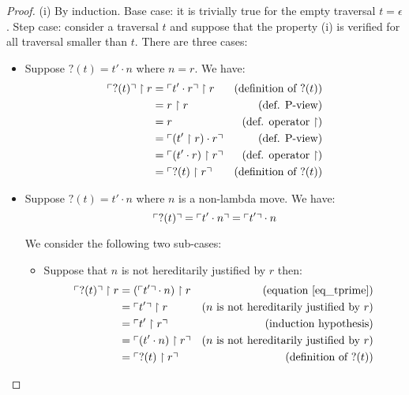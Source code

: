 \begin{proof}
(i) By induction. Base case: it is trivially true for the empty
traversal $t = \epsilon$. Step case: consider a traversal $t$ and
suppose that the property (i) is verified for all traversal smaller
than $t$. There are three cases:
\begin{itemize}
\item Suppose $?(t) = t' \cdot n$ where $n = r$. We have:
    \begin{align*}
    \ulcorner ?(t) \urcorner \upharpoonright  r
        &=  \ulcorner t' \cdot r  \urcorner \upharpoonright  r       & (\mbox{definition of } ?(t))\\
        &=  r \upharpoonright  r                         & (\mbox{def. P-view})\\
        &=  r                                                & (\mbox{def. operator $\upharpoonright$})\\
        &=  \ulcorner (t' \upharpoonright  r ) \cdot r  \urcorner    & (\mbox{def. P-view})\\
        &=  \ulcorner (t' \cdot r)  \upharpoonright  r  \urcorner    & (\mbox{def. operator $\upharpoonright$})\\
        &= \ulcorner ?(t) \upharpoonright  r  \urcorner                & (\mbox{definition of } ?(t))
    \end{align*}

\item Suppose $?(t) = t' \cdot n$ where $n$ is a non-lambda
move. We have:
    \begin{equation}
    \ulcorner ?(t) \urcorner = \ulcorner t' \cdot n \urcorner = \ulcorner t' \urcorner \cdot n  \label{eq_tprime}
    \end{equation}

    We consider the following two sub-cases:
    \begin{itemize}
    \item Suppose that $n$ is not hereditarily justified by $r$ then:
    \begin{align*}
    \ulcorner ?(t) \urcorner \upharpoonright  r
        &= (\ulcorner t' \urcorner \cdot n) \upharpoonright  r  & (\mbox{equation \ref{eq_tprime}}) \\
        &= \ulcorner t' \urcorner \upharpoonright  r            & (n \mbox{ is not hereditarily justified by } r) \\
        &= \ulcorner t' \upharpoonright  r  \urcorner           & (\mbox{induction hypothesis}) \\
        &= \ulcorner (t' \cdot n) \upharpoonright  r  \urcorner & (n \mbox{ is not hereditarily justified by } r) \\
        &= \ulcorner ?(t) \upharpoonright  r   \urcorner           & (\mbox{definition of } ?(t))
    \end{align*}


\end{itemize}
\end{itemize}
\end{proof}
